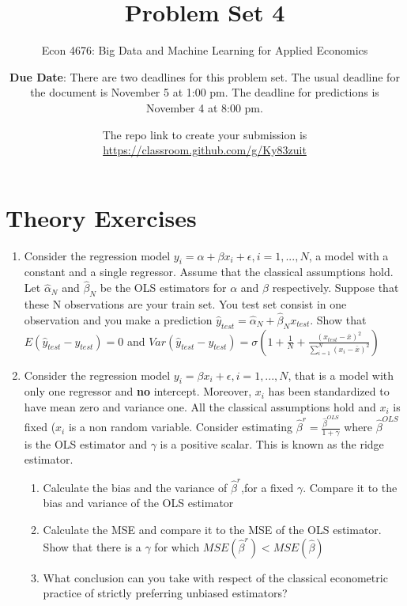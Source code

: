 \documentclass[12pt,onecolumn,A4]{article}
\title{Problem Set 4}
\subtitle{Econ 4676: Big Data and Machine Learning for Applied Economics}
\author{{\bf Due Date}: There are two deadlines for this problem set. The usual deadline for the document is November 5 at 1:00 pm. The deadline for predictions is November 4 at 8:00 pm. }
\date{}
\date{The repo link to create your submission is \url{https://classroom.github.com/g/Ky83zuit}}
\begin{document}
\maketitle

\section{Theory Exercises}

\begin{enumerate}
  \item Consider the regression model $y_i = \alpha +\beta x_i +\epsilon, i=1,...,N$, a model with a constant and a single regressor. Assume that the classical assumptions hold. Let $\hat \alpha_N$ and $\hat \beta_N$ be the OLS estimators for $\alpha$ and $\beta$ respectively. Suppose that these N observations are your train set. You test set consist in one observation and you make a prediction $\hat y_{test}=\hat \alpha_N + \hat \beta_N x_{test}$. Show that $E(\hat y_{test}-y_{test})=0$ and $Var(\hat y_{test}-y_{test})=\sigma \left( 1+\frac{1}{N}+\frac{(x_{test}-\bar x)^2}{\sum_{i=1}^N (x_i-\bar x)^2 }\right)$
  
  
  
  
  \item Consider the regression model $y_i =  \beta x_i +\epsilon, i=1,...,N$, that is a model with only one regressor and {\bf no} intercept. Moreover, $x_i$ has been standardized to have mean zero and variance one. All the classical assumptions hold and $x_i$ is fixed ($x_i$ is a non random variable. Consider estimating $\hat \beta^r= \frac{\hat \beta^{OLS}}{1+\gamma}$ where $\hat \beta^{OLS}$ is the OLS estimator and $\gamma$ is a positive scalar. This is known as the ridge estimator.
  \begin{enumerate}
    \item Calculate the bias and the variance of $\hat \beta^r$,for a fixed $\gamma$. Compare it to the bias and variance of the OLS estimator
    \item Calculate the MSE and compare it to the MSE of the OLS estimator. Show that there is a $\gamma$ for which $MSE(\hat \beta^r)<MSE(\hat \beta)$
    \item What conclusion can you take with respect of the classical econometric practice of strictly preferring unbiased estimators?

\end{enumerate}  

 




\end{enumerate}
\end{document}
